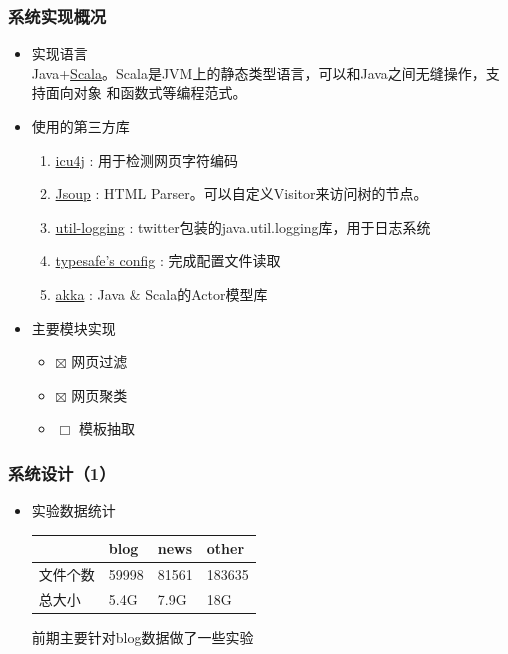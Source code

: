 \documentclass[11pt,presentation]{beamer}
\begin{document}
\begin{frame}
\frametitle{系统实现概况}
\label{sec-2-2}
\begin{itemize}

\item 实现语言\\
\label{sec-2-2-1}%
Java+\href{http://en.wikipedia.org/wiki/Scala_(programming_language)}{Scala}。Scala是JVM上的静态类型语言，可以和Java之间无缝操作，支持面向对象
    和函数式等编程范式。

\item 使用的第三方库
\label{sec-2-2-2}%
\begin{enumerate}
\item \href{http://site.icu-project.org/}{icu4j} : 用于检测网页字符编码
\item \href{http://jsoup.org}{Jsoup} : HTML Parser。可以自定义Visitor来访问树的节点。
\item \href{https://github.com/twitter/util}{util-logging} : twitter包装的java.util.logging库，用于日志系统
\item \href{https://github.com/typesafehub/config}{typesafe's config} : 完成配置文件读取
\item \href{http://akka.io}{akka} : Java \& Scala的Actor模型库
\end{enumerate}


\item 主要模块实现
\label{sec-2-2-3}%
\begin{itemize}
\item $\boxtimes$ 网页过滤
\item $\boxtimes$ 网页聚类
\item $\Box$ 模板抽取
\end{itemize}
\end{itemize} %
\end{frame}
\begin{frame}
\frametitle{系统设计（1）}
\label{sec-2-3}
\begin{itemize}

\item 实验数据统计\\
\label{sec-2-3-1}%
\begin{center}
\begin{tabular}{llll}
           &  blog   &  news   &  other   \\
\hline
 文件个数  &  59998  &  81561  &  183635  \\
 总大小    &  5.4G   &  7.9G   &  18G     \\
\end{tabular}
\end{center}



前期主要针对blog数据做了一些实验

\end{itemize} %
\end{frame}
\end{document}
